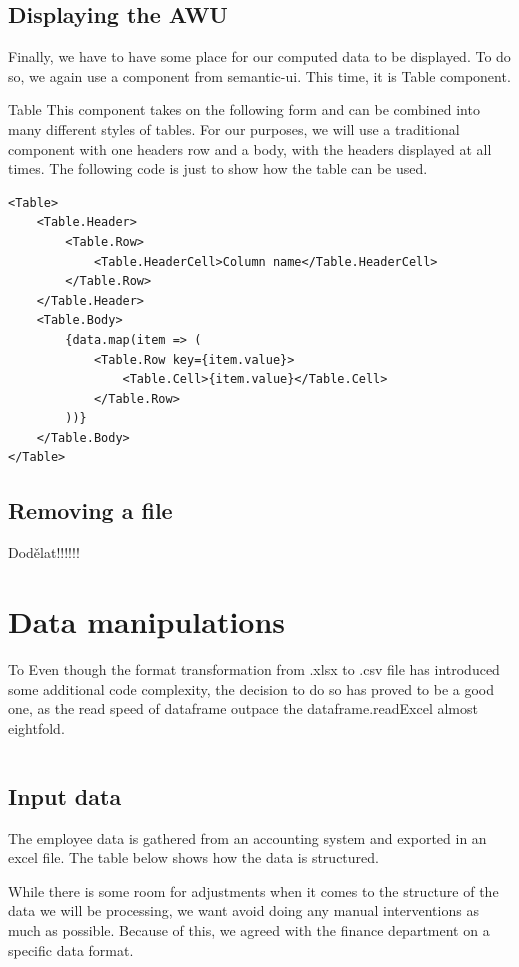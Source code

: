 \documentclass[12pt,oneside]{fithesis2}
\begin{document}
\subsection{Displaying the AWU}
Finally, we have to have some place for our computed data to be displayed. To do so, we again use a component from semantic-ui. This time, it is Table component.

Table This component takes on the following form and can be combined into many different styles of tables. For our purposes, we will use a traditional component with one headers row and a body, with the headers displayed at all times. The following code is just to show how the table can be used.

\begin{lstlisting}[style=htmlcssjs]
<Table>
	<Table.Header>
		<Table.Row>
			<Table.HeaderCell>Column name</Table.HeaderCell>
		</Table.Row>
	</Table.Header>
	<Table.Body>
		{data.map(item => (
			<Table.Row key={item.value}>
				<Table.Cell>{item.value}</Table.Cell>
			</Table.Row>
		))}
	</Table.Body>
</Table>
\end{lstlisting}

\subsection{Removing a file}
Dodělat!!!!!!

\section{Data manipulations}
To 
Even though the format transformation from .xlsx to .csv file has introduced some additional code complexity, the decision to do so has proved to be a good one, as the read speed of dataframe outpace the dataframe.readExcel almost eightfold. \cite{csv-read-speed}

\begin{lstlisting}

\end{lstlisting}

\subsection{Input data}
The employee data is gathered from an accounting system and exported in an excel file. The table below shows how the data is structured.

While there is some room for adjustments when it comes to the structure of the data we will be processing, we want avoid doing any manual interventions as much as possible. Because of this, we agreed with the finance department on a specific data format.
\end{document}
